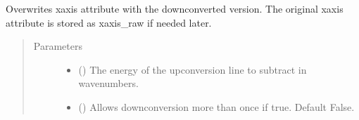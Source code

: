 \documentclass[a4paper,10pt,english]{sphinxmanual}
\begin{document}
\begin{fulllineitems}
\begin{fulllineitems}
\begin{fulllineitems}
\sphinxAtStartPar
Overwrites xaxis attribute with the downconverted version.
The original xaxis attribute is stored as xaxis\_raw if needed later.
\begin{quote}\begin{description}
\item[{Parameters}] \leavevmode\begin{itemize}
\item {} 
\sphinxAtStartPar
{} () \textendash{} The energy of the upconversion line to subtract in wavenumbers.

\item {} 
\sphinxAtStartPar
{} (\sphinxstyleliteralemphasis{\sphinxupquote{, }}) \textendash{} Allows downconversion more than once if true. Default False.

\end{itemize}

\end{description}\end{quote}

\end{fulllineitems}


\begin{fulllineitems}
\label{\detokenize{sfgtools:sfgtools.SFGProcessTools.SFGDataStore.downconverted}}
\end{fulllineitems}


\begin{fulllineitems}
\label{\detokenize{sfgtools:sfgtools.SFGProcessTools.SFGDataStore.exp_divided_bg}}
\end{fulllineitems}



\end{fulllineitems}
\end{fulllineitems}
\end{document}
